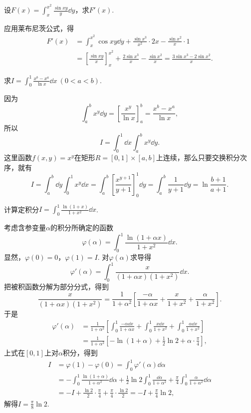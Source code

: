 \begin{example}
设\(F(x) = \int_x^{x^2} \frac{\sin xy}{y} \dd{y}\)，求\(F'(x)\).
\begin{solution}
应用莱布尼茨公式，得\begin{align*}
F'(x) &= \int_x^{x^2} \cos xy \dd{y}
+ \frac{\sin x^3}{x^2} \cdot 2x
- \frac{\sin x^2}{x} \cdot 1 \\
&= \left[ \frac{\sin xy}{x} \right]_x^{x^2}
+ \frac{2 \sin x^3}{x}
- \frac{\sin x^2}{x}
= \frac{3 \sin x^3 - 2 \sin x^2}{x}.
\end{align*}
\end{solution}
\end{example}

\begin{example}
求\(I = \int_0^1 \frac{x^b-x^a}{\ln x} \dd{x}\ (0<a<b)\).
\begin{solution}
因为\[
\int_a^b x^y \dd{y}
= \left[ \frac{x^y}{\ln x} \right]_a^b
= \frac{x^b - x^a}{\ln x},
\]所以\[
I = \int_0^1 \dd{x} \int_a^b x^y \dd{y}.
\]这里函数\(f(x,y) = x^y\)在矩形\(R=[0,1]\times[a,b]\)上连续，那么只要交换积分次序，就有\[
I = \int_a^b \dd{y} \int_0^1 x^y \dd{x}
= \int_a^b \left[\frac{x^{y+1}}{y+1}\right]_0^1 \dd{y}
= \int_a^b \frac{1}{y+1} \dd{y}
= \ln\frac{b+1}{a+1}.
\]
\end{solution}
\end{example}

\begin{example}
计算定积分\(I = \int_0^1 \frac{\ln(1+x)}{1+x^2} \dd{x}\).
\begin{solution}
考虑含参变量\(\alpha\)的积分所确定的函数\[
\varphi(\alpha) = \int_0^1 \frac{\ln(1+\alpha x)}{1+x^2} \dd{x}.
\]显然，\(\varphi(0) = 0\)，\(\varphi(1) = I\).
对\(\varphi(\alpha)\)求导得\[
\varphi'(\alpha)
= \int_0^1 \frac{x}{(1+\alpha x)(1+x^2)} \dd{x}.
\]把被积函数分解为部分分式，得到\[
\frac{x}{(1+\alpha x)(1+x^2)}
= \frac{1}{1+\alpha^2} \left[
\frac{-\alpha}{1+\alpha x}
+ \frac{x}{1+x^2}
+ \frac{\alpha}{1+x^2}
\right].
\]于是\begin{align*}
\varphi'(\alpha)
&= \frac{1}{1+\alpha^2} \left[
\int_0^1 \frac{-\alpha \dd{x}}{1+\alpha x}
+ \int_0^1 \frac{x \dd{x}}{1+x^2}
+ \int_0^1 \frac{\alpha \dd{x}}{1+x^2}
\right] \\
&= \frac{1}{1+\alpha^2} \left[
-\ln(1+\alpha)
+ \frac{1}{2} \ln2
+ \alpha \cdot \frac{\pi}{4}
\right],
\end{align*}
上式在\([0,1]\)上对\(\alpha\)积分，得到\begin{align*}
I &= \varphi(1)-\varphi(0)
= \int_0^1 \varphi'(\alpha) \dd{\alpha} \\
&= - \int_0^1 \frac{\ln(1+\alpha)}{1+\alpha^2} \dd{\alpha}
+ \frac{1}{2} \ln2 \int_0^1 \frac{\dd{\alpha}}{1+\alpha^2}
+ \frac{\pi}{4} \int_0^1 \frac{\alpha}{1+\alpha^2} \dd{\alpha} \\
&= -I + \frac{\ln2}{2} \cdot \frac{\pi}{4} + \frac{\pi}{4}\cdot\frac{\ln2}{2}
= -I + \frac{\pi}{4} \ln2,
\end{align*}
解得\(I = \frac{\pi}{8} \ln2\).
\end{solution}
\end{example}

